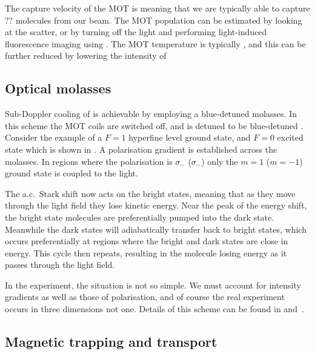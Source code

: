 The capture velocity of the MOT is  meaning that we are typically able
to capture $??$ molecules from our beam. The MOT population can be estimated by
looking at the scatter, or by turning off the light and performing
light-induced fluorescence imaging using . The MOT temperature is
typically \cm{}, and this can be further reduced by lowering the intensity of
~\cite{Truppe2017} 

\subsection*{Optical molasses}

Sub-Doppler cooling of \CaF{} is achievable by employing a blue-detuned
molasses. In this scheme the MOT coils are switched off, and 
is detuned to be blue-detuned .  Consider the example of a
$F=1$ hyperfine level ground state, and $F=0$ excited state which is shown in
. A polarisation gradient is established across the
molasses. In regions where the polarisation is $\sigma_-$ ($\sigma_-$) only the
$m=1$ ($m=-1$) ground state is coupled to the light.

The a.c.\ Stark shift now acts on the bright states, meaning that as they move
through the light field they lose kinetic energy. Near the peak of the energy
shift, the bright state molecules are preferentially pumped into the dark
state. Meanwhile the dark states will adiabatically transfer back to bright
states, which occurs preferentially at regions where the bright and dark states
are close in energy. This cycle then repeats, resulting in the molecule losing
energy as it passes through the light field.


In the \CaF{} experiment, the situation is not so simple. We must account for
intensity gradients as well as those of polarisation, and of course the real
experiment occurs in three dimensions not one. Details of this scheme can be
found in  and~\cite{Truppe2017}.

\subsection*{Magnetic trapping and transport}

